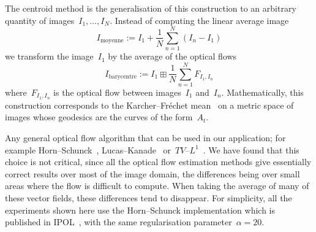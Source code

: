\documentclass{ipol}
\def\u{\mathbf{u}}
\begin{document}

The centroid method is the generalisation of this construction to an arbitrary
quantity of images~$I_1,\ldots,I_N$.  Instead of computing the linear average
image
\begin{equation}
	I_{\mathrm{moyenne}}:=I_1+\frac{1}{N}\sum_{n=1}^N(I_n-I_1)
	\label{eq:Iavg}
\end{equation}
we transform the image~$I_1$ by the average of the optical flows
\begin{equation}
	I_{\mathrm{barycentre}}:=I_1\boxplus\frac{1}{N}\sum_{n=1}^NF_{I_1,I_n}
	\label{eq:Icentroid}
\end{equation}
where~$F_{I_1,I_n}$ is the optical flow between images~$I_1$ and~$I_n$.
Mathematically, this construction corresponds to the Karcher--Fréchet
mean~\cite{klassen2004analysis,pennec2006intrinsic,thorstensen2009pre} on a
metric space of images whose geodesics are the curves of the form~$A_t$.

Any general optical flow algorithm that can be used in our application; for
example Horn--Schunck~\cite{horn1981determining,HSipol},
Lucas--Kanade~\cite{bouguet2001pyramidal}
or~$TV$--$L^1$~\cite{zach2007duality,TVL1ipol}.  We have found that this
choice is not critical, since all the optical flow estimation methods give
essentially correct results over most of the image domain, the differences
being over small areas where the flow is difficult to compute.  When taking
the average of many of these vector fields, these differences tend to
disappear.  For simplicity, all the experiments shown here use the
Horn--Schunck implementation which is published in IPOL~\cite{HSipol}, with
the same regularisation parameter~$\alpha=20$.
\end{document}
